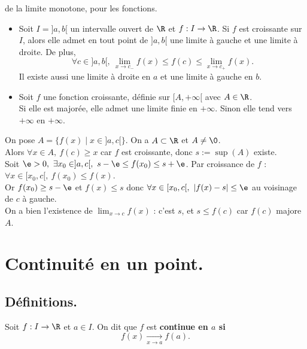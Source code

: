 \documentclass[11pt]{article}
\begin{document}
\vspace*{-0.4cm}

\begin{thm}{de la limite monotone, pour les fonctions.}{}
    \begin{itemize}
        \item Soit $I=]a,b[$ un intervalle ouvert de $\R$ et $f:I\to\R$. Si $f$ est croissante sur $I$, alors elle admet en tout point de $]a,b[$ une limite à gauche et une limite à droite. De plus,
        \begin{equation*}
            \forall c \in ]a,b[, ~ \lim_{x\to c_-} f(x) \leq f(c) \leq \lim_{x\to c_+} f(x).
        \end{equation*}
        Il existe aussi une limite à droite en $a$ et une limite à gauche en $b$.
        \item Soit $f$ une fonction croissante, définie sur $[A,+\infty[$ avec $A\in\R$.\\
        Si elle est majorée, elle admet une limite finie en $+\infty$. Sinon elle tend vers $+\infty$ en $+\infty$.
    \end{itemize}
    \tcblower
    On pose $A=\{f(x)\mid x\in]a,c[\}$. On a $A\subset \R$ et $A\neq\0$.\\
    Alors $\forall x \in A, ~ f(c)\geq x$ car $f$ est croissante, donc $s:=\sup(A)$ existe.\\
    Soit $\e>0, ~ \exists x_0 \in ]a,c[, ~ s-\e\leq f(x_0) \leq s+\e$. Par croissance de $f$ : $\forall x \in [x_0,c[, ~ f(x_0)\leq f(x)$.\\
    Or $f(x_0)\geq s-\e$ et $f(x)\leq s$ donc $\forall x \in [x_0,c[, ~ |f(x)-s|\leq \e$ au voisinage de $c$ à gauche.\\
    On a bien l'existence de $\lim_{x\to c}f(x)$ : c'est $s$, et $s\leq f(c)$ car $f(c)$ majore $A$.
\end{thm}

\section{Continuité en un point.}

\subsection{Définitions.}

\begin{defi}{}{}
    Soit $f:I\to\R$ et $a\in I$. On dit que $f$ est \bf{continue en $a$} si
    \begin{equation*}
        f(x)\xrightarrow[x\to a]{}f(a).
    \end{equation*}
\end{defi}
\end{document}
